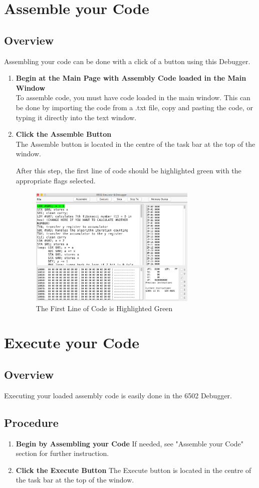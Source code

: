 \documentclass[a3paper, 11pt]{article}
\begin{document}
\section{Assemble your Code}
\subsection{Overview}
Assembling your code can be done with a click of a button using this Debugger. 
\begin{enumerate}
	\item \textbf{Begin at the Main Page with Assembly Code loaded in the Main Window}\\
	To assemble code, you must have code loaded in the main window. This can be done by importing the code from a .txt file, copy and pasting the code, or typing it directly into the text window. 
	\item \textbf{Click the Assemble Button}\\
	The Assemble button is located in the centre of the task bar at the top of the window. 
	\par
	After this step, the first line of code should be highlighted green with the appropriate flags selected. 
	\begin{figure}[h!]
		\centering
		\includegraphics[width=8cm, height=5.74cm]{Assemble}
		\caption{The First Line of Code is Highlighted Green}
	\end{figure} 
\end{enumerate}

\section{Execute your Code}
\subsection{Overview}
Executing your loaded assembly code is easily done in the 6502 Debugger. 
\subsection{Procedure}
\begin{enumerate}
	\item \textbf{Begin by Assembling your Code}
	If needed, see "Assemble your Code" section for further instruction.
	\item \textbf{Click the Execute Button}
	The Execute button is located in the centre of the task bar at the top of the window.	
\end{enumerate}
\end{document}
